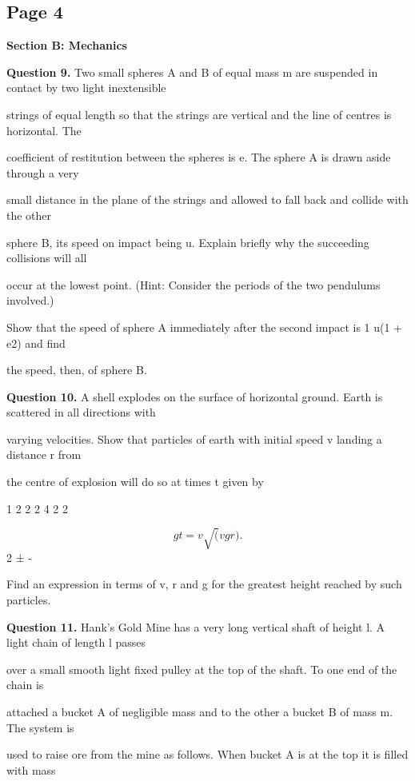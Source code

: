 \documentclass[12pt]{article}
\begin{document}
\subsection*{Page 4}
\begin{flushleft}
\bigskip\textbf{Section B: Mechanics}\par
\bigskip\textbf{Question 9.} Two small spheres A and B of equal mass m are suspended in contact by two light inextensible\par
strings of equal length so that the strings are vertical and the line of centres is horizontal. The\par
coefficient of restitution between the spheres is e. The sphere A is drawn aside through a very\par
small distance in the plane of the strings and allowed to fall back and collide with the other\par
sphere B, its speed on impact being u. Explain briefly why the succeeding collisions will all\par
occur at the lowest point. (Hint: Consider the periods of the two pendulums involved.)\par
Show that the speed of sphere A immediately after the second impact is 1 u(1 + e2) and find\par
the speed, then, of sphere B.\par
\bigskip\textbf{Question 10.} A shell explodes on the surface of horizontal ground. Earth is scattered in all directions with\par
varying velocities. Show that particles of earth with initial speed v landing a distance r from\par
the centre of explosion will do so at times t given by\par
1 2 2 2 4 2 2\par
\[g t = v \sqrt(v g r ).\]
2 ± -\par
Find an expression in terms of v, r and g for the greatest height reached by such particles.\par
\bigskip\textbf{Question 11.} Hank's Gold Mine has a very long vertical shaft of height l. A light chain of length l passes\par
over a small smooth light fixed pulley at the top of the shaft. To one end of the chain is\par
attached a bucket A of negligible mass and to the other a bucket B of mass m. The system is\par
used to raise ore from the mine as follows. When bucket A is at the top it is filled with mass\par

\end{flushleft}
\end{document}
